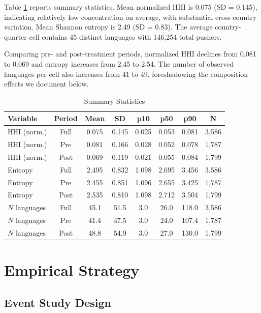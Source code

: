 \documentclass[12pt]{article}
\begin{document}
Table \ref{tab:summary} reports summary statistics. Mean normalized HHI is 0.075 (SD = 0.145), indicating relatively low concentration on average, with substantial cross-country variation. Mean Shannon entropy is 2.49 (SD = 0.83). The average country-quarter cell contains 45 distinct languages with 146,254 total pushers.

Comparing pre- and post-treatment periods, normalized HHI declines from 0.081 to 0.069 and entropy increases from 2.45 to 2.54. The number of observed languages per cell also increases from 41 to 49, foreshadowing the composition effects we document below.

\begin{table}[H]
\centering
\caption{Summary Statistics}
\label{tab:summary}
\small
\begin{tabular}{lccccccc}
\toprule
Variable & Period & Mean & SD & p10 & p50 & p90 & N \\
\midrule
HHI (norm.) & Full & 0.075 & 0.145 & 0.025 & 0.053 & 0.081 & 3,586 \\
HHI (norm.) & Pre & 0.081 & 0.166 & 0.028 & 0.052 & 0.078 & 1,787 \\
HHI (norm.) & Post & 0.069 & 0.119 & 0.021 & 0.055 & 0.084 & 1,799 \\
\midrule
Entropy & Full & 2.495 & 0.832 & 1.098 & 2.695 & 3.456 & 3,586 \\
Entropy & Pre & 2.455 & 0.851 & 1.096 & 2.655 & 3.425 & 1,787 \\
Entropy & Post & 2.535 & 0.810 & 1.098 & 2.712 & 3.504 & 1,799 \\
\midrule
$N$ languages & Full & 45.1 & 51.5 & 3.0 & 26.0 & 118.0 & 3,586 \\
$N$ languages & Pre & 41.4 & 47.5 & 3.0 & 24.0 & 107.4 & 1,787 \\
$N$ languages & Post & 48.8 & 54.9 & 3.0 & 27.0 & 130.0 & 1,799 \\
\bottomrule
\end{tabular}
\end{table}

\section{Empirical Strategy}

\subsection{Event Study Design}
\end{document}
